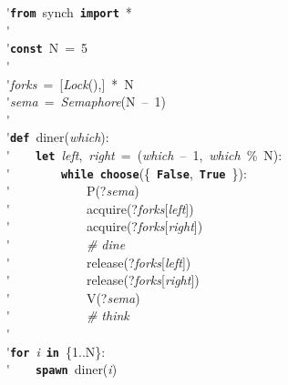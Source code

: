 \'\>\texttt{\textbf{from}}~synch~\texttt{\textbf{import}}~*\\

\'\>\\

\'\>\texttt{\textbf{const}}~N~=~5\\

\'\>\\

\'\>\textit{forks}~=~[\textit{Lock}(),]~*~N\\

\'\>\textit{sema}~=~\textit{Semaphore}(N~--~1)\\

\'\>\\

\'\>\texttt{\textbf{def}}~diner(\textit{which}):\\

\'\>~~~~\texttt{\textbf{let}}~\textit{left},~\textit{right}~=~(\textit{which}~--~1,~\textit{which}~\%~N):\\

\'\>~~~~~~~~\texttt{\textbf{while}}~\texttt{\textbf{choose}}(\{~\texttt{\textbf{False}},~\texttt{\textbf{True}}~\}):\\

\'\>~~~~~~~~~~~~P(?\textit{sema})\\

\'\>~~~~~~~~~~~~acquire(?\textit{forks}[\textit{left}])\\

\'\>~~~~~~~~~~~~acquire(?\textit{forks}[\textit{right}])\\

\'\>~~~~~~~~~~~~\emph{\# dine}\\

\'\>~~~~~~~~~~~~release(?\textit{forks}[\textit{left}])\\

\'\>~~~~~~~~~~~~release(?\textit{forks}[\textit{right}])\\

\'\>~~~~~~~~~~~~V(?\textit{sema})\\

\'\>~~~~~~~~~~~~\emph{\# think}\\

\'\>\\

\'\>\texttt{\textbf{for}}~\textit{i}~\texttt{\textbf{in}}~\{1..N\}:\\

\'\>~~~~\texttt{\textbf{spawn}}~diner(\textit{i})